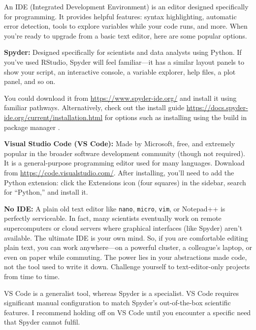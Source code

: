 An IDE (Integrated Development Environment) is an editor designed specifically for programming. It provides helpful features: syntax highlighting, automatic error detection, tools to explore variables while your code runs, and more. When you're ready to upgrade from a basic text editor, here are some popular options.

\textbf{Spyder:} Designed specifically for scientists and data analysts using Python. If you've used RStudio, Spyder will feel familiar---it has a similar layout panels to show your script, an interactive console, a variable explorer, help files, a plot panel, and so on.

You could download it from \url{https://www.spyder-ide.org/} and install it using familiar pathways. Alternatively, check out the install guide \url{https://docs.spyder-ide.org/current/installation.html} for options such as installing using the build in package manager .

\textbf{Visual Studio Code (VS Code):} Made by Microsoft, free, and extremely popular in the broader software development community (though not required). It is a general-purpose programming editor used for many languages. Download from \url{https://code.visualstudio.com/}. After installing, you'll need to add the Python extension: click the Extensions icon (four squares) in the sidebar, search for ``Python,'' and install it.

\textbf{No IDE:} A plain old text editor like \texttt{nano}, \texttt{micro}, \texttt{vim}, or Notepad++ is perfectly serviceable. In fact, many scientists eventually work on remote supercomputers or cloud servers where graphical interfaces (like Spyder) aren't available. The ultimate IDE is your own mind. So, if you are comfortable editing plain text, you can work anywhere---on a powerful cluster, a colleague's laptop, or even on paper while commuting. The power lies in your abstractions made code, not the tool used to write it down. Challenge yourself to text-editor-only projects from time to time.

\begin{note}
VS Code is a generalist tool, whereas Spyder is a specialist. VS Code requires significant manual configuration to match Spyder's out-of-the-box scientific features. I recommend holding off on VS Code until you encounter a specific need that Spyder cannot fulfil.
\end{note}

